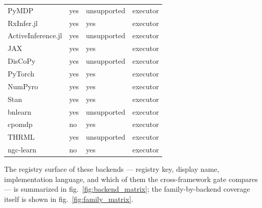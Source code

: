 \documentclass[
  english,
  9pt,
]{extarticle}
\begin{document}
\begin{longtable}[]{@{}llll@{}}
PyMDP & yes & unsupported & executor \\
RxInfer.jl & yes & yes & executor \\
ActiveInference.jl & yes & unsupported & executor \\
JAX & yes & yes & executor \\
DisCoPy & yes & unsupported & executor \\
PyTorch & yes & yes & executor \\
NumPyro & yes & yes & executor \\
Stan & yes & yes & executor \\
bnlearn & yes & unsupported & executor \\
cpomdp & no & yes & executor \\
THRML & yes & unsupported & executor \\
ngc-learn & no & yes & executor \\
\end{longtable}

The registry surface of these backends --- registry key, display name,
implementation language, and which of them the cross-framework gate
compares --- is summarized in fig.~\ref{fig:backend_matrix}; the
family-by-backend coverage itself is shown in
fig.~\ref{fig:family_matrix}.
\end{document}
